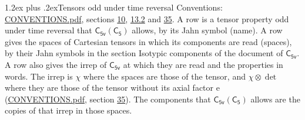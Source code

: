 \documentclass[10pt,a4paper]{article}
\makeatletter
\renewcommand\section{\@startsection{section}{1}{\z@}{-3ex plus -1ex minus -.2ex}%
  {1.2ex plus .2ex}{\normalfont\large\sffamily\bfseries\color{parttitle}}}
\numberwithin{equation}{section}
\newcommand{\grp}[1]{\mathsf{#1}}
\newcommand{\irrprod}{\otimes}
\makeatother
\begin{document}
\section{Tensors odd under time reversal}\label{s:time_odd}
Conventions: \href{../../CONVENTIONS.pdf}{CONVENTIONS.pdf}, sections \href{../../../rotation/CONVENTIONS.pdf\#conv.10}{10}, \href{../../../rotation/CONVENTIONS.pdf\#conv.13.2}{13.2} and \href{../../CONVENTIONS.pdf\#conv.35}{35}.
\leavevmode\label{n:head.name.property}A row is a tensor property odd under time reversal that $\grp{C_{5v}}(\grp{C_{5}})$ allows, by its Jahn symbol (name). \label{n:head.spaces}A row gives the spaces of Cartesian tensors in which its components are read (spaces), by their Jahn symbols in the section Isotypic components of the document of \href{../../../rotation/data/pdf/C5v.pdf}{$\grp{C_{5v}}$}. \label{n:head.properties}A row also gives the irrep of $\grp{C_{5v}}$ at which they are read and the properties in words. The irrep is $\chi$ where the spaces are those of the tensor, and $\chi \irrprod \det$ where they are those of the tensor without its axial factor e (\href{../../CONVENTIONS.pdf}{CONVENTIONS.pdf}, section \href{../../CONVENTIONS.pdf\#conv.35}{35}). The components that $\grp{C_{5v}}(\grp{C_{5}})$ allows are the copies of that irrep in those spaces.
\end{document}
